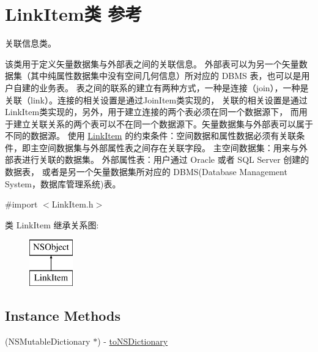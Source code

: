 \hypertarget{interface_link_item}{\section{Link\-Item类 参考}
\label{interface_link_item}
}


关联信息类。 \par
 该类用于定义矢量数据集与外部表之间的关联信息。 外部表可以为另一个矢量数据集（其中纯属性数据集中没有空间几何信息）所对应的 D\-B\-M\-S 表，也可以是用户自建的业务表。 表之间的联系的建立有两种方式，一种是连接（join），一种是关联（link）。连接的相关设置是通过\-Join\-Item类实现的， 关联的相关设置是通过\-Link\-Item类实现的，另外，用于建立连接的两个表必须在同一个数据源下， 而用于建立关联关系的两个表可以不在同一个数据源下。矢量数据集与外部表可以属于不同的数据源。 使用 \hyperlink{interface_link_item}{Link\-Item} 的约束条件：空间数据和属性数据必须有关联条件，即主空间数据集与外部属性表之间存在关联字段。 主空间数据集：用来与外部表进行关联的数据集。 外部属性表：用户通过 Oracle 或者 S\-Q\-L Server 创建的数据表， 或者是另一个矢量数据集所对应的 D\-B\-M\-S(Database Management System，数据库管理系统)表。  




{\ttfamily \#import $<$Link\-Item.\-h$>$}

类 Link\-Item 继承关系图\-:\begin{figure}[H]
\begin{center}
\leavevmode
\includegraphics[height=2.000000cm]{interface_link_item}
\end{center}
\end{figure}
\subsection*{Instance Methods}
\begin{DoxyCompactItemize}
\item 
(N\-S\-Mutable\-Dictionary $\ast$) -\/ \hyperlink{interface_link_item_a98a7c06027e61104fb82cacb8558a49d}{to\-N\-S\-Dictionary}
\end{DoxyCompactItemize}
